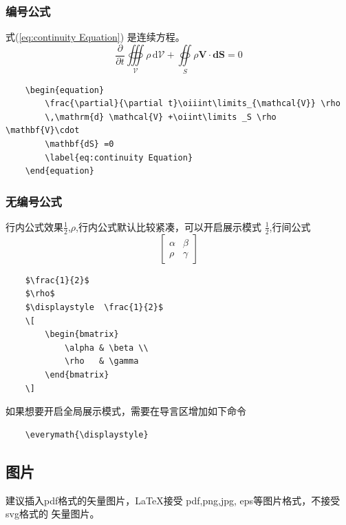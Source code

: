 \subsubsection{编号公式}
式(\ref{eq:continuity Equation}) 是连续方程。
\begin{equation}
    \frac{\partial}{\partial t}\oiiint\limits_{\mathcal{V}} \rho 
    \,\mathrm{d} \mathcal{V} +\oiint\limits _S \rho \mathbf{V}\cdot 
    \mathbf{dS} =0
    \label{eq:continuity Equation}
\end{equation}

\begin{lstlisting}
    \begin{equation}
        \frac{\partial}{\partial t}\oiiint\limits_{\mathcal{V}} \rho 
        \,\mathrm{d} \mathcal{V} +\oiint\limits _S \rho \mathbf{V}\cdot 
        \mathbf{dS} =0
        \label{eq:continuity Equation}
    \end{equation}
\end{lstlisting}

\subsubsection{无编号公式}
行内公式效果$\frac{1}{2}$,$\rho$,行内公式默认比较紧凑，可以开启展示模式
$\displaystyle  \frac{1}{2}$,行间公式 
\[
    \begin{bmatrix}
        \alpha & \beta \\ 
        \rho   & \gamma 
    \end{bmatrix}
\]

\begin{lstlisting}
    $\frac{1}{2}$
    $\rho$
    $\displaystyle  \frac{1}{2}$
    \[
        \begin{bmatrix}
            \alpha & \beta \\ 
            \rho   & \gamma 
        \end{bmatrix}
    \]
\end{lstlisting}

如果想要开启全局展示模式，需要在导言区增加如下命令
\begin{lstlisting}
    \everymath{\displaystyle}
\end{lstlisting}

\subsection{图片}
建议插入{\ttfamily pdf}格式的矢量图片，\LaTeX{}接受
{\ttfamily pdf},{\ttfamily png},{\ttfamily jpg},
{\ttfamily eps}等图片格式，不接受{\ttfamily svg}格式的
矢量图片。

